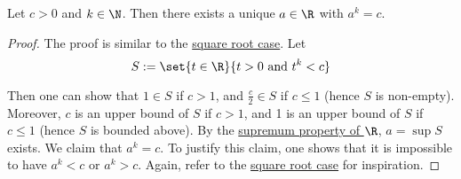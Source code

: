 Let $c>0$ and $k\in\N$. Then there exists a unique $a\in\R$ with $a^k=c$.

\begin{proof}
  The proof is similar to the \href{b88beb7}{square root case}. Let
  $$
    S:=\set{t\in\R}{t>0\text{ and }t^k<c}
  $$

  Then one can show that $1\in S$ if $c>1$, and $\frac c2\in S$ if $c\leq1$
  (hence $S$ is non-empty). Moreover, $c$ is an upper bound of $S$ if $c>1$, and
  1 is an upper bound of $S$ if $c\leq1$ (hence $S$ is bounded above). By the
  \href{f330cf9}{supremum property of $\R$}, $a=\sup S$ exists. We claim that
  $a^k=c$. To justify this claim, one shows that it is impossible to have $a^k<c$
  or $a^k>c$. Again, refer to the \href{b88beb7}{square root case} for
  inspiration.
\end{proof}
